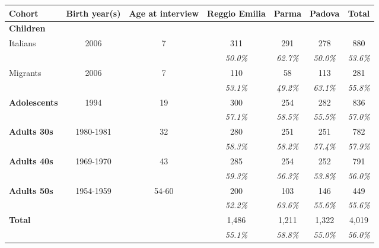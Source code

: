 \begin{tabular}{l c c c c c c}
\toprule
Cohort & Birth year(s) & Age at interview & Reggio Emilia & Parma & Padova & \textbf{Total} \\			
\midrule
\textbf{Children} &  &  &  & &  &  \\ 
\quad Italians & 2006 & 7 & 311 & 291& 278 & 880 \\
			&&	& \textit{50.0\%} &  \textit{62.7\%} &  \textit{50.0\%} &  \textit{53.6\%} \\
\quad Migrants & 2006 & 7 & 110 & 58 & 113 & 281 \\
			&& 	&  \textit{53.1\%} &  \textit{49.2\%} &  \textit{63.1\%} &  \textit{55.8\%} \\
\textbf{Adolescents} & 1994 & 19 & 300 & 254 & 282 & 836 \\
			&& 	&  \textit{57.1\%} &  \textit{58.5\%} &  \textit{55.5\%} &  \textit{57.0\%} \\
\textbf{Adults 30s} & 1980-1981 & 32 & 280 & 251 & 251 & 782 \\
			&& 	&  \textit{58.3\%} &  \textit{58.2\%} &  \textit{57.4\%} &  \textit{57.9\%} \\
\textbf{Adults 40s} & 1969-1970 & 43 & 285 & 254 & 252 & 791 \\
			&& 	&  \textit{59.3\%} &  \textit{56.3\%} &  \textit{53.8\%} &  \textit{56.0\%}\\
\textbf{Adults 50s} & 1954-1959 & 54-60 & 200 & 103 & 146 & 449 \\
			&& 	&  \textit{52.2\%} &  \textit{63.6\%} &  \textit{55.6\%}  &  \textit{55.6\%}\\
\midrule
\textbf{Total}	& 				& & 1,486 & 1,211 & 1,322 & 4,019 \\
			&&				& \textit{55.1\%} &  \textit{58.8\%} &  \textit{55.0\%} & \textit{56.0\%} \\
\bottomrule
\end{tabular}
